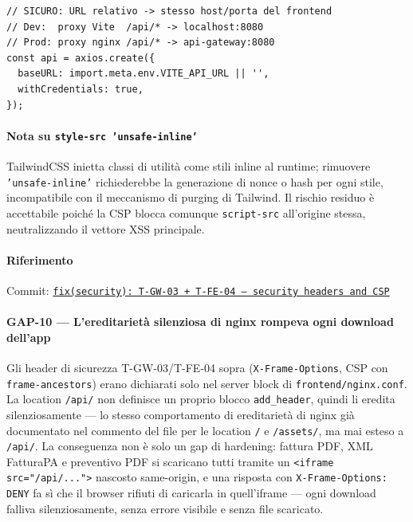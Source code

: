 ﻿\documentclass[a4paper,12pt]{report}
\newcommand{\commitref}[2]{\texttt{\small \href{https://github.com/diegoandruccioli/hotel-pms/commit/#1}{#2}}}
\begin{document}
\begin{securebox}[title={api.ts --- baseURL relativo, same-origin e CSP-compatibile}]
\begin{lstlisting}[style=typescript]
// SICURO: URL relativo -> stesso host/porta del frontend
// Dev:  proxy Vite  /api/* -> localhost:8080
// Prod: proxy nginx /api/* -> api-gateway:8080
const api = axios.create({
  baseURL: import.meta.env.VITE_API_URL || '',
  withCredentials: true,
});
\end{lstlisting}
\end{securebox}

\paragraph{Nota su \texttt{style-src 'unsafe-inline'}}
TailwindCSS inietta classi di utilità come stili inline al runtime; rimuovere
\texttt{'unsafe-inline'} richiederebbe la generazione di nonce o hash per ogni stile,
incompatibile con il meccanismo di purging di Tailwind. Il rischio residuo è accettabile
poiché la CSP blocca comunque \texttt{script-src} all'origine stessa, neutralizzando
il vettore XSS principale.

\paragraph{Riferimento} Commit: \commitref{b901a9f}{fix(security): T-GW-03 + T-FE-04 --- security headers and CSP}

\paragraph{GAP-10 --- L'ereditarietà silenziosa di nginx rompeva ogni download dell'app}
Gli header di sicurezza T-GW-03/T-FE-04 sopra (\texttt{X-Frame-Options},
CSP con \texttt{frame-ancestors}) erano dichiarati solo nel server block di
\texttt{frontend/nginx.conf}. La location \texttt{/api/} non definisce un proprio
blocco \texttt{add\_header}, quindi li eredita silenziosamente --- lo stesso
comportamento di ereditarietà di nginx già documentato nel commento del file per le
location \texttt{/} e \texttt{/assets/}, ma mai esteso a \texttt{/api/}. La
conseguenza non è solo un gap di hardening: fattura PDF, XML FatturaPA e preventivo
PDF si scaricano tutti tramite un \texttt{<iframe src="/api/...">} nascosto
same-origin, e una risposta con \texttt{X-Frame-Options: DENY} fa sì che il browser
rifiuti di caricarla in quell'iframe --- ogni download falliva silenziosamente,
senza errore visibile e senza file scaricato.
\end{document}
